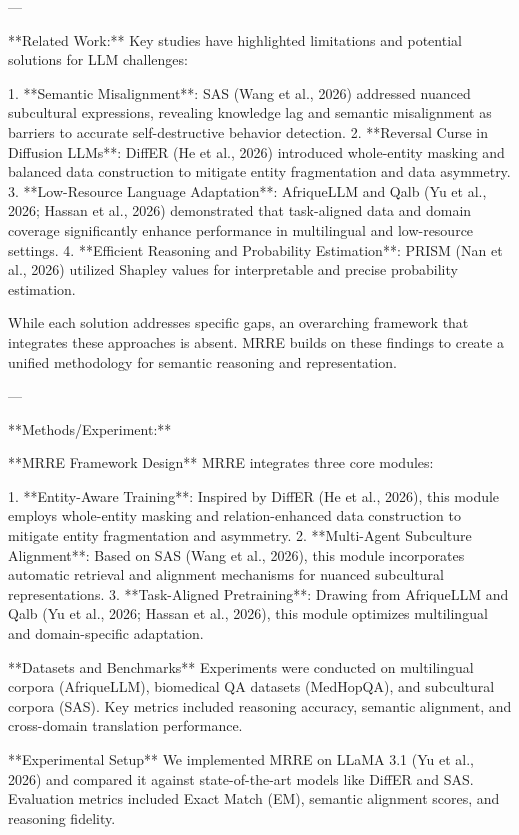 ---

**Related Work:**  
Key studies have highlighted limitations and potential solutions for LLM challenges:  

1. **Semantic Misalignment**: SAS (Wang et al., 2026) addressed nuanced subcultural expressions, revealing knowledge lag and semantic misalignment as barriers to accurate self-destructive behavior detection.
2. **Reversal Curse in Diffusion LLMs**: DiffER (He et al., 2026) introduced whole-entity masking and balanced data construction to mitigate entity fragmentation and data asymmetry.  
3. **Low-Resource Language Adaptation**: AfriqueLLM and Qalb (Yu et al., 2026; Hassan et al., 2026) demonstrated that task-aligned data and domain coverage significantly enhance performance in multilingual and low-resource settings.  
4. **Efficient Reasoning and Probability Estimation**: PRISM (Nan et al., 2026) utilized Shapley values for interpretable and precise probability estimation.  

While each solution addresses specific gaps, an overarching framework that integrates these approaches is absent. MRRE builds on these findings to create a unified methodology for semantic reasoning and representation.

---

**Methods/Experiment:**  

**MRRE Framework Design**  
MRRE integrates three core modules:  

1. **Entity-Aware Training**: Inspired by DiffER (He et al., 2026), this module employs whole-entity masking and relation-enhanced data construction to mitigate entity fragmentation and asymmetry.  
2. **Multi-Agent Subculture Alignment**: Based on SAS (Wang et al., 2026), this module incorporates automatic retrieval and alignment mechanisms for nuanced subcultural representations.  
3. **Task-Aligned Pretraining**: Drawing from AfriqueLLM and Qalb (Yu et al., 2026; Hassan et al., 2026), this module optimizes multilingual and domain-specific adaptation.  

**Datasets and Benchmarks**  
Experiments were conducted on multilingual corpora (AfriqueLLM), biomedical QA datasets (MedHopQA), and subcultural corpora (SAS). Key metrics included reasoning accuracy, semantic alignment, and cross-domain translation performance.  

**Experimental Setup**  
We implemented MRRE on LLaMA 3.1 (Yu et al., 2026) and compared it against state-of-the-art models like DiffER and SAS. Evaluation metrics included Exact Match (EM), semantic alignment scores, and reasoning fidelity.

